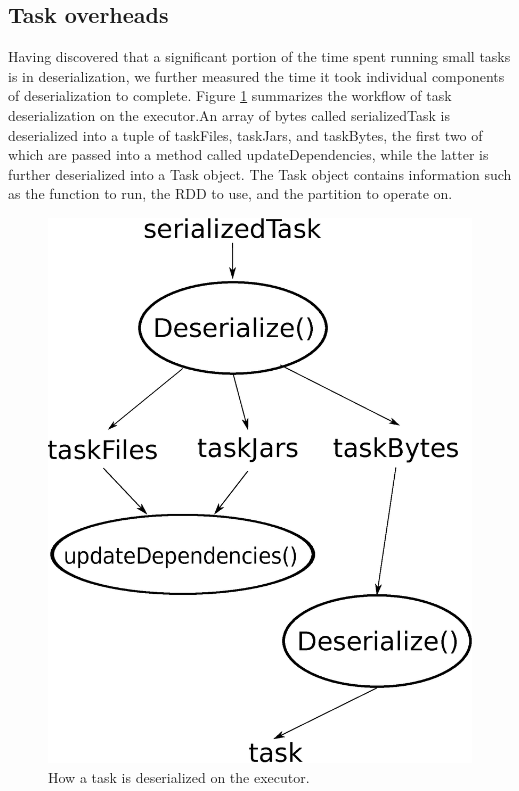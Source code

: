\subsection{Task overheads}
Having discovered that a significant portion of the time spent running small tasks is in deserialization, we further measured the time it took individual components of deserialization to complete. Figure \ref{fig:deserialization} summarizes the workflow of task deserialization on the executor.An array of bytes called serializedTask is deserialized into a tuple of taskFiles, taskJars, and taskBytes, the first two of which are passed into a method called updateDependencies, while the latter is further deserialized into a Task object. The Task object contains information such as the function to run, the RDD to use, and the partition to operate on.

\begin{figure}[h!]
  \begin{center}
    \includegraphics[scale=0.30]{deserialization.eps}
  \end{center}
  \caption{How a task is deserialized on the executor.}
  \label{fig:deserialization}
\end{figure}

